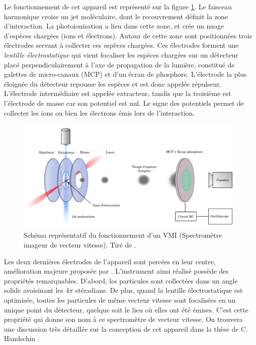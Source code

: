 Le fonctionnement de cet appareil est représenté sur la figure \ref{fig:vmi}. Le faisceau harmonique croise un jet moléculaire, dont le recouvrement définit la zone d'interaction. La photoionisation a lieu dans cette zone, et crée un nuage d'espèces chargées (ions et électrons). Autour de cette zone sont positionnées trois électrodes servant à collecter ces espèces chargées. Ces électrodes forment une \textit{lentille électrostatique} qui vient focaliser les espèces chargées sur un détecteur placé perpendiculairement à l'axe de propagation de la lumière, constitué de galettes de micro-canaux (MCP) et d'un écran de phosphore. L'électrode la plus éloignée du détecteur repousse les espèces et est donc appelée répulseur. L'électrode intermédiaire est appelée extracteur, tandis que la troisième est l'électrode de masse car son potentiel est nul. Le signe des potentiels permet de collecter les ions ou bien les électrons émis lors de l'interaction. 

\begin{figure}[!ht]
\centering
\includegraphics[width=1\columnwidth]{Figures/PECD/vmi.png}%
\caption{Schéma représentatif du fonctionnement d'un VMI (Spectromètre imageur de vecteur vitesse). Tiré de .}
\label{fig:vmi}
\end{figure}

Les deux dernières électrodes de l'appareil sont percées en leur centre, amélioration majeure proposée par . L'instrument ainsi réalisé possède des propriétés remarquables. D'abord, les particules sont collectées dans un angle solide avoisinant les $4\pi$ stéradians. De plus, quand la lentille électrostatique est optimisée, toutes les particules de même vecteur vitesse sont focalisées en un unique point du détecteur, quelque soit le lieu où elles ont été émises. C'est cette propriété qui donne son nom à ce spectromètre de vecteur vitesse. On trouvera une discussion très détaillée sur la conception de cet appareil dans la thèse de C. Handschin .

